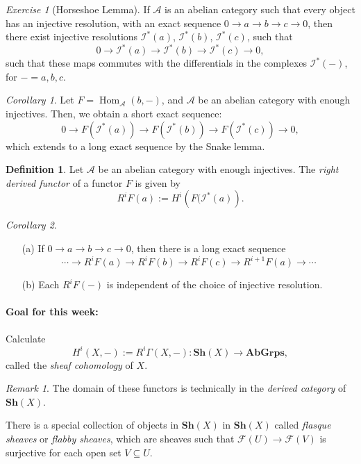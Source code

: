 \documentclass[a4paper]{report}
\theoremstyle{definition}
\newtheorem{definition}{Definition}
\theoremstyle{remark}
\newtheorem{remark}{Remark}
\theoremstyle{proposition}
\theoremstyle{conjecture}
\theoremstyle{lemma}
\theoremstyle{corollary}
\newtheorem{corollary}{Corollary}
\theoremstyle{exercise}
\newtheorem{exercise}{Exercise}
\theoremstyle{example}
\newcommand{\mcal}{\mathcal}
\newcommand{\on}{\operatorname}
\begin{document}
\begin{exercise}[Horseshoe Lemma]
    If $\mcal{A}$ is an abelian category such that every object has an 
    injective resolution, with an exact sequence $0\to a \to b \to c\to 0$,
    then there exist injective resolutions $\mcal{I}^\ast(a)$, $\mcal{I}^\ast(b)$, 
    $\mcal{I}^\ast(c)$, such that 
    $$0 \longrightarrow \mcal{I}^\ast(a) \longrightarrow \mcal{I}^\ast(b) \longrightarrow \mcal{I}^\ast(c) \longrightarrow 0,$$
    such that these maps commutes with the differentials in the complexes
    $\mcal{I}^\ast(-)$, for $-=a,b,c$.
\end{exercise}

\begin{corollary}
    Let $F = \on{Hom}_\mcal{A}(b,-)$, and $\mcal{A}$ be an abelian 
    category with enough injectives.
    Then, we obtain a short exact sequence:
    $$0 \longrightarrow F(\mcal{I}^\ast(a)) \longrightarrow F(\mcal{I}^\ast(b)) \longrightarrow F(\mcal{I}^\ast(c)) \longrightarrow 0,$$
    which extends to a long exact sequence by the Snake lemma.
\end{corollary}

\begin{definition}
    Let $\mcal{A}$ be an abelian category with enough injectives.
    The \emph{right derived functor} of a functor $F$ is given by 
    $$R^iF(a) := H^i\left( F(\mcal{I}^\ast(a)\right).$$
\end{definition}

\begin{corollary}
    \leavevmode
    \begin{itemize}
        \item[(a)] If $0 \to a \to b \to c \to 0$, then there is a long 
            exact sequence 
            $$\cdots \longrightarrow R^iF(a) \longrightarrow R^iF(b) \longrightarrow R^iF(c) \longrightarrow R^{i+1}F(a) \longrightarrow \cdots$$
        \item[(b)] Each $R^iF(-)$ is independent of the choice of injective 
            resolution.
    \end{itemize}
\end{corollary}

\paragraph{Goal for this week:} Calculate $$H^i(X,-) := R^i\Gamma(X,-) : \mathbf{Sh}(X) \longrightarrow \mathbf{AbGrps},$$
called the \emph{sheaf cohomology} of $X$.
\begin{remark}
    The domain of these functors is technically in the \emph{derived category}
    of $\mathbf{Sh}(X)$.
\end{remark}
There is a special collection of objects in $\mathbf{Sh}(X)$ in $\mathbf{Sh}(X)$
called \emph{flasque sheaves} or \emph{flabby sheaves}, which 
are sheaves such that $\mcal{F}(U) \to \mcal{F}(V)$ is surjective 
for each open set $V\subseteq U$.
\end{document}
